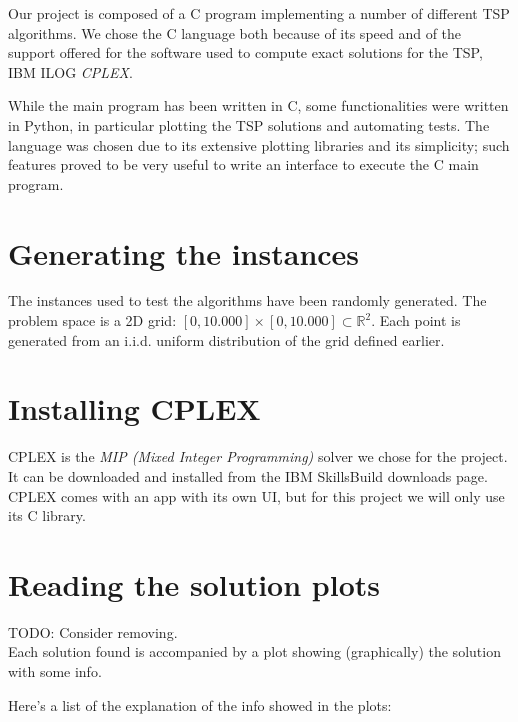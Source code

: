 Our project is composed of a C program implementing a number of different TSP algorithms. We chose the C language both because of its speed and of the support offered for the software used to compute exact solutions for the TSP, IBM ILOG \textit{CPLEX}.

While the main program has been written in C, some functionalities were written in Python, in particular plotting the TSP solutions and automating tests. The language was chosen due to its extensive plotting libraries and its simplicity; such features proved to be very useful to write an interface to execute the C main program.

\section{Generating the instances}

The instances used to test the algorithms have been randomly generated. The problem space is a 2D grid: $[0,10.000]\times[0,10.000]\subset\mathbb{R}^2$. Each point is generated from an i.i.d. uniform distribution of the grid defined earlier.

\section{Installing CPLEX}

CPLEX is the \textit{MIP (Mixed Integer Programming)} solver we chose for the project. It can be downloaded and installed from the IBM SkillsBuild downloads page. CPLEX comes with an app with its own UI, but for this project we will only use its C library. 

\section{Reading the solution plots}

TODO: Consider removing.\\

Each solution found is accompanied by a plot showing (graphically) the solution with some info.

Here's a list of the explanation of the info showed in the plots:

